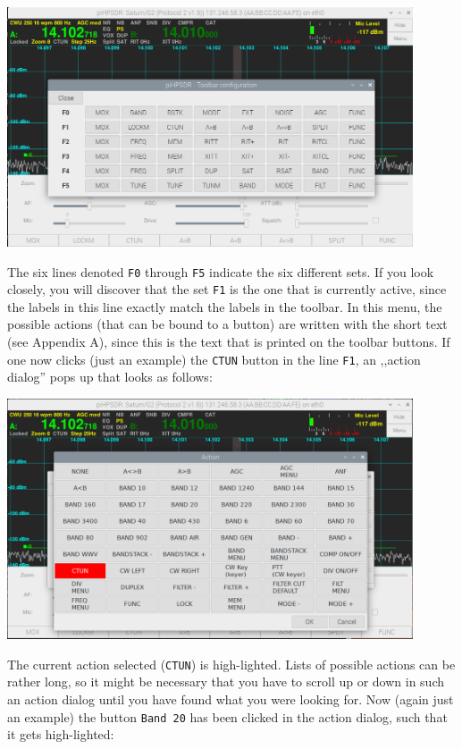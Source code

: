 \documentclass[12pt]{book}
\begin{document}
\begin{center}
\includegraphics[width=12cm]{ToolbarMenu1.png}
\end{center}

The six lines denoted \texttt{F0} through \texttt{F5} indicate the six different sets. If you
look closely, you will discover that the set \texttt{F1} is the one that is currently active,
since the labels in this line exactly match the labels in the toolbar. In this menu, the
possible actions (that can be bound to a button) are written with the short text (see Appendix A),
since this is the text that is printed on the toolbar buttons. If one now clicks (just an example)
the \texttt{CTUN} button in the line \texttt{F1}, an ,,action dialog'' pops up that looks as follows:

\begin{center}
\includegraphics[width=12cm]{ToolbarMenu2.png}
\end{center}

The current action selected (\texttt{CTUN}) is high-lighted. Lists of possible actions can be rather long,
so it might be necessary that you have to scroll up or down in such an action dialog until you have
found what you were looking for. Now (again just an example) the button \texttt{Band 20} has been clicked
in the action dialog, such that it gets high-lighted:
\end{document}

